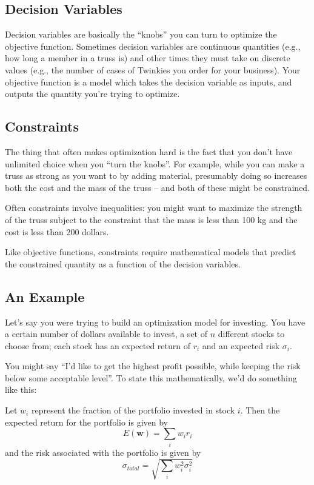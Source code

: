\documentclass{tufte-handout}
\newcommand{\w}{\mathbf{w}}
\begin{document}
\subsection{Decision Variables}
Decision variables are basically the ``knobs'' you can turn to optimize the objective function.  Sometimes decision variables are continuous quantities (e.g., how long a member in a truss is) and other times they must take on discrete values (e.g., the number of cases of Twinkies you order for your business).  Your objective function is a model which takes the decision variable as inputs, and outputs the quantity you're trying to optimize.

\subsection{Constraints}
The thing that often makes optimization hard is the fact that you don't have unlimited choice when you ``turn the knobs''.  For example, while you can make a truss as strong as you want to by adding material, presumably doing so increases both the cost and the mass of the truss -- and both of these might be constrained.

Often constraints involve inequalities:  you might want to maximize the strength of the truss subject to the constraint that the mass is less than 100 kg and the cost is less than 200 dollars.

Like objective functions, constraints require mathematical models that predict the constrained quantity as a function of the decision variables.

\subsection{An Example}

Let's say you were trying to build an optimization model for investing.  You have a certain number of dollars available to invest, a set of $n$ different stocks to choose from; each stock has an expected return of $r_i$ and an expected risk $\sigma_i$.

You might say ``I'd like to get the highest profit possible, while keeping the risk below some acceptable level''.  To state this mathematically, we'd do something like this:

Let $w_i$ represent the fraction of the portfolio invested in stock $i$.  Then the expected return for the portfolio is given by
$$E(\w) = \sum_i w_i r_i$$
and the risk associated with the portfolio is given by
$$\sigma_{total} = \sqrt{\sum_i w_i^2 \sigma_i^2}$$
\end{document}

